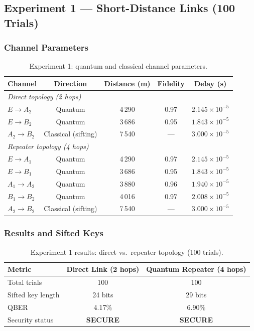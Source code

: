 \documentclass[12pt,oneside,letterpaper,english]{article}
\begin{document}
\subsection{Experiment 1 --- Short-Distance Links (100 Trials)}

\subsubsection{Channel Parameters}

\begin{table}[h!]
\centering
\caption{Experiment 1: quantum and classical channel parameters.}
\label{tab:exp1_channels}
\begin{tabular}{lcccc}
\toprule
\textbf{Channel} & \textbf{Direction} & \textbf{Distance (m)} & \textbf{Fidelity} & \textbf{Delay (s)} \\
\midrule
\multicolumn{5}{l}{\textit{Direct topology (2 hops)}} \\
\midrule
$E \to A_2$ & Quantum & 4\,290 & 0.97 & $2.145 \times 10^{-5}$ \\
$E \to B_2$ & Quantum & 3\,686 & 0.95 & $1.843 \times 10^{-5}$ \\
$A_2 \to B_2$ & Classical (sifting) & 7\,540 & --- & $3.000 \times 10^{-5}$ \\
\midrule
\multicolumn{5}{l}{\textit{Repeater topology (4 hops)}} \\
\midrule
$E \to A_1$ & Quantum & 4\,290 & 0.97 & $2.145 \times 10^{-5}$ \\
$E \to B_1$ & Quantum & 3\,686 & 0.95 & $1.843 \times 10^{-5}$ \\
$A_1 \to A_2$ & Quantum & 3\,880 & 0.96 & $1.940 \times 10^{-5}$ \\
$B_1 \to B_2$ & Quantum & 4\,016 & 0.97 & $2.008 \times 10^{-5}$ \\
$A_2 \to B_2$ & Classical (sifting) & 7\,540 & --- & $3.000 \times 10^{-5}$ \\
\bottomrule
\end{tabular}
\end{table}

\subsubsection{Results and Sifted Keys}

\begin{table}[h!]
\centering
\caption{Experiment 1 results: direct vs.\ repeater topology (100 trials).}
\label{tab:exp1_results}
\begin{tabular}{lcc}
\toprule
\textbf{Metric} & \textbf{Direct Link (2 hops)} & \textbf{Quantum Repeater (4 hops)} \\
\midrule
Total trials & 100 & 100 \\
Sifted key length & 24 bits & 29 bits \\
QBER & 4.17\% & 6.90\% \\
Security status & \textbf{SECURE} & \textbf{SECURE} \\
\bottomrule
\end{tabular}
\end{table}
\end{document}
